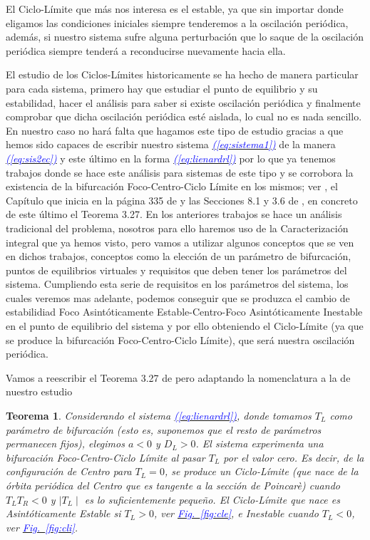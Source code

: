 \documentclass[12pt,a4paper]{report} %
\newtheorem{theorem}{Teorema}[chapter]
\newcommand{\fref}[1]{\hyperref[#1]{\textcolor{blue}{\textit{Fig.~\ref*{#1}}}}}
\newcommand{\eref}[1]{\hyperref[#1]{\textcolor{blue}{\textit{(\ref*{#1})}}}}
\begin{document}
	El Ciclo-Límite que más nos interesa es el estable, ya que sin importar donde eligamos las condiciones iniciales siempre tenderemos a la oscilación periódica, además, si nuestro sistema sufre alguna perturbación que lo saque de la oscilación periódica siempre tenderá a reconducirse nuevamente hacia ella.
	
	\vspace{0.5cm}El estudio de los Ciclos-Límites historicamente se ha hecho de manera particular para cada sistema, primero hay que estudiar el punto de equilibrio y su estabilidad, hacer el análisis para saber si existe oscilación periódica y finalmente comprobar que dicha oscilación periódica esté aislada, lo cual no es nada sencillo. En nuestro caso no hará falta que hagamos este tipo de estudio gracias a que hemos sido capaces de escribir nuestro sistema \eref{eq:sistema1} de la manera \eref{eq:sis2ec} y este último en la forma \eref{eq:lienardrl} por lo que ya tenemos trabajos donde se hace este análisis para sistemas de este tipo y se corrobora la existencia de la bifurcación Foco-Centro-Ciclo Límite en los mismos; ver \cite{ponce}, el Capítulo que inicia en la página 335 de \cite{ciclolimite} y las Secciones 8.1 y 3.6 de \cite{amarillo}, en concreto de este último el Teorema 3.27. En los anteriores trabajos se hace un análisis tradicional del problema, nosotros para ello haremos uso de la Caracterización integral que ya hemos visto, pero vamos a utilizar algunos conceptos que se ven en dichos trabajos, conceptos como la elección de un parámetro de bifurcación, puntos de equilibrios virtuales y requisitos que deben tener los parámetros del sistema. Cumpliendo esta serie de requisitos en los parámetros del sistema, los cuales veremos mas adelante, podemos conseguir que se produzca el cambio de estabilidiad Foco Asintóticamente Estable-Centro-Foco Asintóticamente Inestable en el punto de equilibrio del sistema y por ello obteniendo el Ciclo-Límite (ya que se produce la bifurcación Foco-Centro-Ciclo Límite), que será nuestra oscilación periódica.
	
	\newpage
	
	\vspace{0.5cm}\noindent Vamos a reescribir el Teorema 3.27 de \cite{amarillo} pero adaptando la nomenclatura a la de nuestro estudio
	
	\begin{theorem}
		\label{teo:5.1}
		Considerando el sistema \eref{eq:lienardrl}, donde tomamos $T_L$ como parámetro de bifurcación (esto es, suponemos que el resto de parámetros permanecen fijos), elegimos $a<0$ y $D_L>0$. El sistema experimenta una bifurcación Foco-Centro-Ciclo Límite al pasar $T_L$ por el valor cero. Es decir, de la configuración de Centro para $T_L=0$, se produce un Ciclo-Límite (que nace de la órbita periódica del Centro que es tangente a la sección de Poincarè) cuando $T_L T_R<0$ y $\mid T_L \mid$ es lo suficientemente pequeño. El Ciclo-Límite que nace es Asintóticamente Estable si $T_L>0$, ver \fref{fig:cle}, e Inestable cuando $T_L<0$, ver \fref{fig:cli}.
	\end{theorem}
	
\end{document}

